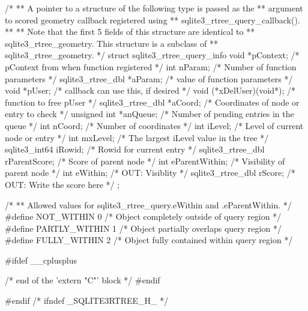 \begin{Codex}[label=sqlite3.h,numbers=left]
{/*
** A pointer to a structure of the following type is passed as the 
** argument to scored geometry callback registered using
** sqlite3_rtree_query_callback().
**
** Note that the first 5 fields of this structure are identical to
** sqlite3_rtree_geometry.  This structure is a subclass of
** sqlite3_rtree_geometry.
*/
struct sqlite3_rtree_query_info {
  void *pContext;                   /* pContext from when function registered */
  int nParam;                       /* Number of function parameters */
  sqlite3_rtree_dbl *aParam;        /* value of function parameters */
  void *pUser;                      /* callback can use this, if desired */
  void (*xDelUser)(void*);          /* function to free pUser */
  sqlite3_rtree_dbl *aCoord;        /* Coordinates of node or entry to check */
  unsigned int *anQueue;            /* Number of pending entries in the queue */
  int nCoord;                       /* Number of coordinates */
  int iLevel;                       /* Level of current node or entry */
  int mxLevel;                      /* The largest iLevel value in the tree */
  sqlite3_int64 iRowid;             /* Rowid for current entry */
  sqlite3_rtree_dbl rParentScore;   /* Score of parent node */
  int eParentWithin;                /* Visibility of parent node */
  int eWithin;                      /* OUT: Visiblity */
  sqlite3_rtree_dbl rScore;         /* OUT: Write the score here */
};

/*
** Allowed values for sqlite3_rtree_query.eWithin and .eParentWithin.
*/
#define NOT_WITHIN       0   /* Object completely outside of query region */
#define PARTLY_WITHIN    1   /* Object partially overlaps query region */
#define FULLY_WITHIN     2   /* Object fully contained within query region */


#ifdef __cplusplus
}  /* end of the 'extern "C"' block */
#endif

#endif  /* ifndef _SQLITE3RTREE_H_ */

\end{Codex}
